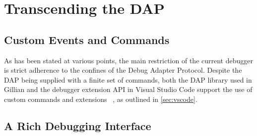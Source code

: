 
\section{Transcending the DAP}\label{sec:debug-interface}

\subsection{Custom Events and Commands}

As has been stated at various points, the main restriction of the current
debugger is strict adherence to the confines of the Debug Adapter Protocol.
Despite the DAP being supplied with a finite set of commands, both the DAP
library used in Gillian and the debugger extension API in Visual Studio Code
support the use of custom commands and extensions%
~\cite{ocaml-dap-custom, vscode-dap-custom-event, vscode-dap-custom-request}, as
outlined in \autoref{sec:vscode}.



\subsection{A Rich Debugging Interface}

